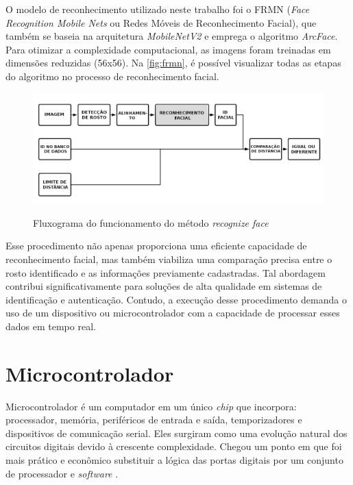 O modelo de reconhecimento utilizado neste trabalho foi o FRMN 
(\textit{Face Recognition Mobile Nets} ou Redes Móveis de Reconhecimento Facial), que 
também se baseia na arquitetura \textit{MobileNetV2} e emprega o 
algoritmo \textit{ArcFace}. Para otimizar a complexidade computacional, 
as imagens foram treinadas em dimensões reduzidas (56x56). 
Na \autoref{fig:frmn}, 
é possível visualizar todas as etapas do algoritmo 
no processo de reconhecimento facial.

\begin{figure}[h!]
    \centering
    \caption{Fluxograma do funcionamento do método \textit{recognize face}}
    \includegraphics[scale=0.3]{figuras/face-recognition.png}
    \label{fig:frmn}
    \centering
\end{figure}


Esse procedimento não apenas proporciona uma eficiente capacidade de 
reconhecimento facial, mas também viabiliza uma comparação precisa entre 
o rosto identificado e as informações previamente cadastradas. Tal abordagem 
contribui significativamente para soluções de alta qualidade em sistemas de 
identificação e autenticação. Contudo, a execução desse procedimento demanda 
o uso de um dispositivo ou microcontrolador com a capacidade de processar 
esses dados em tempo real. 

\section{Microcontrolador}\label{sec:microcontrolador}

Microcontrolador é um computador em um único \textit{chip} que incorpora: processador, 
memória, periféricos de entrada e saída, temporizadores e dispositivos de 
comunicação serial. Eles surgiram como uma evolução natural dos circuitos digitais 
devido à crescente complexidade. Chegou um ponto em que foi mais prático e 
econômico substituir a lógica das portas digitais por um conjunto de 
processador e \textit{software} \cite{penido2013}.

